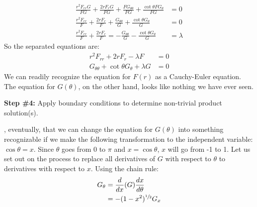 \begin{align*}
\frac{r^2 F_{rr}G}{FG} + \frac{2rF_rG}{FG} + \frac{FG_{\theta\theta}}{FG} + \frac{\cot{\theta}FG_{\theta}}{FG} &= 0 \\
\frac{r^2F_{rr}}{F} + \frac{2rF_r}{F} + \frac{G_{\theta\theta}}{G} + \frac{\cot{\theta}G_{\theta}}{G} &= 0 \\
\frac{r^2 F_{rr}}{F} + \frac{2rF_r}{F} = -\frac{G_{\theta\theta}}{G} - \frac{\cot{\theta}G_{\theta}}{G} &= \lambda
\end{align*}
So the separated equations are:
\begin{align*}
r^2F_{rr} + 2rF_{r} - \lambda F &= 0 \\
G_{\theta\theta} + \cot{\theta}G_{\theta} + \lambda G &= 0
\end{align*}
We can readily recognize the equation for $F(r)$ as a Cauchy-Euler equation.  The equation for $G(\theta)$, on the other hand, looks like nothing we have ever seen.

\vspace{0.25cm}

\noindent\textbf{Step \#4:} Apply boundary conditions to determine non-trivial product solution(s).

, eventually, that we can change the equation for $G(\theta)$ into something recognizable if we make the following transformation to the independent variable: $\cos{\theta} = x$.  Since $\theta$ goes from 0 to $\pi$ and $x = \cos{\theta}$, $x$ will go from -1 to 1. Let us set out on the process to replace all derivatives of $G$ with respect to $\theta$ to derivatives with respect to $x$. Using the chain rule:
\begin{align*}
G_{\theta} &= \frac{d}{dx}(G)\frac{dx}{d\theta} \\
&= -(1-x^2)^{\sfrac{1}{2}}G_x
\end{align*}

